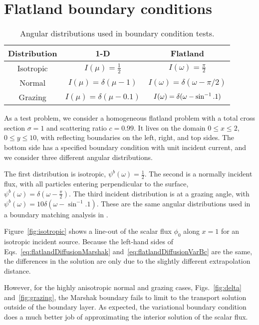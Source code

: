 \clearpage
\section{Flatland boundary conditions}

\begin{table}[htb]
  \centering
  \begin{tabular}{ccc}
\toprule
    Distribution & 1-D & Flatland
\\ \midrule
Isotropic & $I(\mu) = \frac{1}{2}$ & $I(\omega) = \frac{\pi}{2}$
\\
Normal & $I(\mu) = \delta(\mu-1)$ & $I(\omega) = \delta(\omega-\pi/2)$
\\
Grazing & $I(\mu) = \delta(\mu-0.1)$ & $I(\omega) = \delta(\omega-\sin^{-1}.1)$
\\ \bottomrule
  \end{tabular}
  \caption{Angular distributions used in boundary condition tests.}
  \label{tab:angularDistributions}
\end{table}

As a test problem, we consider a homogeneous flatland problem with a
total cross section $\sigma=1$ and scattering ratio $c=0.99$. It lives on the
domain $0 \le x \le 2$, $0 \le y \le 10$, with reflecting boundaries on the left,
right, and top sides. The bottom side has a specified boundary
condition with unit incident current, and we consider three different angular
distributions.

The first distribution is isotropic, $\psi^b(\omega) = \frac{1}{2}$. The second
is a normally incident flux, with all particles entering
perpendicular to the surface, $\psi^b(\omega) = \delta(\omega -
\frac{\pi}{2})$. The third incident distribution is at a grazing angle, with 
$\psi^b(\omega) = 10 \delta(\omega - \sin^{-1}.1)$.
These are the same angular distributions used in a boundary matching analysis
in \cite{Dav2006}.

Figure~\ref{fig:isotropic} shows a line-out of the scalar flux $\phi_0$ along
$x=1$ for an isotropic incident source. Because the left-hand sides of
Eqs.~\eqref{eq:flatlandDiffusionMarshak} and~\eqref{eq:flatlandDiffusionVarBc} are the same, the
differences in the solution are only due to the slightly different
extrapolation distance.

However, for the highly anisotropic normal and grazing cases,
Figs.~\ref{fig:delta} and~\ref{fig:grazing}, the Marshak boundary fails to
limit to the transport solution outside of the boundary layer. As
expected, the variational boundary condition does a much better job of
approximating the interior solution of the scalar flux.

